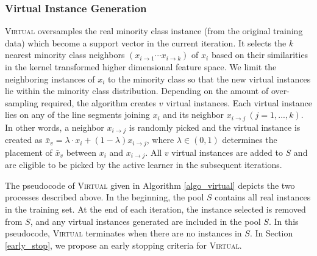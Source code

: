 \subsubsection{Virtual Instance Generation}
\textsc{Virtual} oversamples the real minority class instance (from the original training data) which become a support vector in the current iteration. It selects the $k$ nearest minority class neighbors $(x_{i\rightarrow 1} \cdots x_{i \rightarrow k})$ of $x_i$ based on their similarities in the kernel transformed higher dimensional feature space. We limit the neighboring instances of $x_i$ to the minority class so that the new virtual instances lie within the minority class distribution. Depending on the amount of over-sampling required, the algorithm creates $v$ virtual instances. Each virtual instance lies on any of the line segments joining $x_i$ and its neighbor $x_{i\rightarrow j}\ (j=1,...,k)$. In other words, a neighbor $x_{i \rightarrow j}$ is randomly picked and the virtual instance is created as $\bar{x}_v = \lambda \cdot x_i + (1-\lambda)x_{i \rightarrow j}$,  where $\lambda\in(0,1)$ determines the placement of $\bar{x}_v$ between $x_i$ and $x_{i \rightarrow j}$. All $v$ virtual instances are added to $S$ and are eligible to be picked by the active learner in the subsequent iterations.

The pseudocode of \textsc{Virtual} given in Algorithm \ref{algo_virtual}  depicts the two processes described above. In the beginning, the pool $S$ contains all real instances in the training set. At the end of each iteration, the instance selected is removed from $S$, and any virtual instances generated are included in the pool $S$. In this pseudocode, \textsc{Virtual} terminates when there are no instances in $S$. In Section \ref{early_stop}, we propose an early stopping criteria for \textsc{Virtual}.

